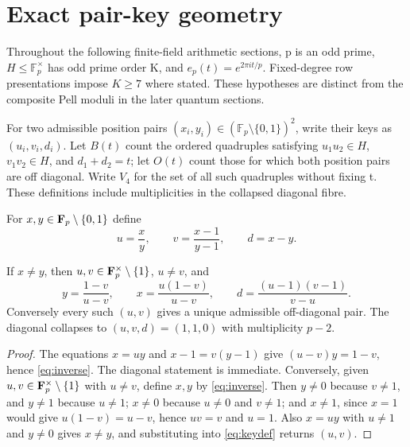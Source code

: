 \section{Exact pair-key geometry}

Throughout the following finite-field arithmetic sections, p is an odd prime,
$H\leq\mathbb F_p^\times$ has odd prime order K, and
$e_p(t)=e^{2\pi i t/p}$. Fixed-degree row presentations impose $K\geq7$
where stated. These hypotheses are distinct from the composite Pell moduli
in the later quantum sections.

For two admissible position pairs $(x_i,y_i)\in(\mathbb F_p\setminus\{0,1\})^2$,
write their keys as $(u_i,v_i,d_i)$. Let $B(t)$ count the ordered quadruples
satisfying $u_1u_2\in H$, $v_1v_2\in H$, and $d_1+d_2=t$; let $O(t)$ count
those for which both position pairs are off diagonal. Write $V_4$ for the
set of all such quadruples without fixing t. These definitions include
multiplicities in the collapsed diagonal fibre.

For $x,y\in\mathbf F_p\setminus\{0,1\}$ define
\begin{equation}\label{eq:keydef}
 u=\frac{x}{y},\qquad
 v=\frac{x-1}{y-1},\qquad
 d=x-y.
\end{equation}

\begin{proposition}\label{prop:key}
If $x\ne y$, then $u,v\in\mathbf F_p^\times\setminus\{1\}$, $u\ne v$, and
\begin{equation}\label{eq:inverse}
 y=\frac{1-v}{u-v},\qquad
 x=\frac{u(1-v)}{u-v},\qquad
 d=\frac{(u-1)(v-1)}{v-u}.
\end{equation}
Conversely every such $(u,v)$ gives a unique admissible off-diagonal pair.
The diagonal collapses to $(u,v,d)=(1,1,0)$ with multiplicity $p-2$.
\end{proposition}

\begin{proof}
The equations $x=uy$ and $x-1=v(y-1)$ give $(u-v)y=1-v$, hence
\eqref{eq:inverse}.  The diagonal statement is immediate.  Conversely, given
$u,v\in\mathbf F_p^\times\setminus\{1\}$ with $u\ne v$, define $x,y$ by
\eqref{eq:inverse}.  Then $y\ne0$ because $v\ne1$, and $y\ne1$ because $u\ne1$;
$x\ne0$ because $u\ne0$ and $v\ne1$; and $x\ne1$, since $x=1$ would give
$u(1-v)=u-v$, hence $uv=v$ and $u=1$.  Also $x=uy$ with $u\ne1$ and $y\ne0$
gives $x\ne y$, and substituting into \eqref{eq:keydef} returns $(u,v)$.
\end{proof}

